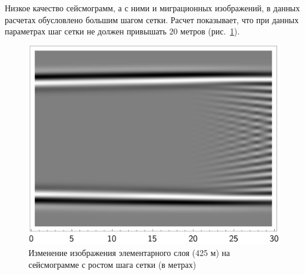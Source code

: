 \documentclass{article}
\newcommand  {\figref  } [1]     {рис.~\ref{#1}}
\newcommand  {\figrefp } [1]     {(\figref{#1})}
\begin{document}
Низкое качество сейсмограмм, а с ними и миграционных изображений, в данных расчетах обусловлено большим шагом сетки.
Расчет показывает, что при данных параметрах шаг сетки не должен привышать $20$ метров \figrefp{step}.
%
\begin{figure}[tb]
\centering
\includegraphics[width=.3333\textwidth]{pic/report_april/step}
\caption{Изменение изображения элементарного слоя (425 м) на сейсмограмме с ростом шага сетки (в метрах)}\label{step}
\end{figure}
\end{document}
